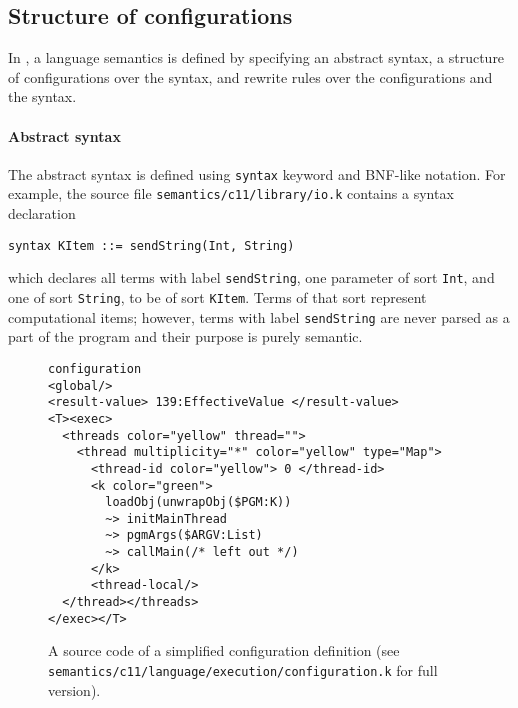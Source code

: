 \documentclass{fithesis3}
\begin{document}
\subsection{Structure of configurations}


In \K, a language semantics is defined by specifying an abstract syntax, a structure of configurations over the syntax, and rewrite rules over the configurations and the syntax.

\paragraph{Abstract syntax}
The abstract syntax is defined using \texttt{syntax} keyword and BNF-like notation. For example, the
source file \texttt{semantics/c11/library/io.k} contains a syntax declaration
\begin{lstlisting}
syntax KItem ::= sendString(Int, String)
\end{lstlisting}
which declares all terms with label \texttt{sendString}, one parameter of sort \texttt{Int}, and one of sort \texttt{String}, to be of sort \texttt{KItem}. Terms of that sort represent computational items; however, terms with label \texttt{sendString} are never parsed as a part of the program and their purpose is purely semantic. 


\begin{figure}
\begin{lstlisting}
configuration
<global/>
<result-value> 139:EffectiveValue </result-value>
<T><exec>
  <threads color="yellow" thread="">
    <thread multiplicity="*" color="yellow" type="Map">
      <thread-id color="yellow"> 0 </thread-id>
      <k color="green">
        loadObj(unwrapObj($PGM:K))
        ~> initMainThread
        ~> pgmArgs($ARGV:List)
        ~> callMain(/* left out */)
      </k>
      <thread-local/>
  </thread></threads>
</exec></T>
\end{lstlisting}
\caption{A source code of a simplified configuration definition (see \texttt{semantics/c11/language/execution/configuration.k} for full version).}
\label{exampleConfigurationDefinition}
\end{figure}
\end{document}
